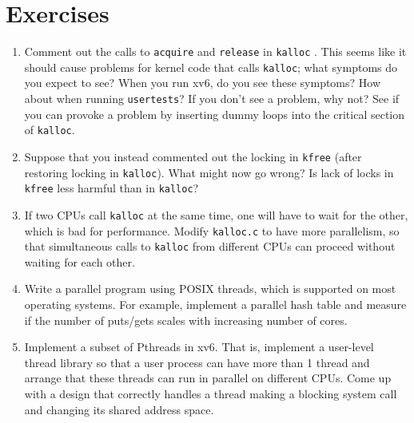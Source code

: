\section{Exercises}

\begin{enumerate}
  
\item Comment out the calls to
\lstinline{acquire}
and
\lstinline{release}
in
\lstinline{kalloc}
.
This seems like it should cause problems for
kernel code that calls
\lstinline{kalloc};
what symptoms do you expect to see?
When you run xv6, do you see these symptoms?
How about when running
\lstinline{usertests}?
If you don't see a problem, why not?
See if you can provoke a problem by inserting
dummy loops into the critical section of
\lstinline{kalloc}.

\item Suppose that you instead commented out the
locking in
\lstinline{kfree} 
(after restoring locking in
\lstinline{kalloc}).
What might now go wrong? Is lack of locks in
\lstinline{kfree}
less harmful than in
\lstinline{kalloc}?

\item If two CPUs call
\lstinline{kalloc}
at the same time, one will have to wait for the other,
which is bad for performance.
Modify 
\lstinline{kalloc.c}
to have more parallelism, so that simultaneous
calls to
\lstinline{kalloc}
from different CPUs can proceed without waiting for each other.

\item Write a parallel program using POSIX threads, which is supported on most
operating systems. For example, implement a parallel hash table and measure if
the number of puts/gets scales with increasing number of cores.

\item Implement a subset of Pthreads in xv6.  That is, implement a user-level
thread library so that a user process can have more than 1 thread and arrange
that these threads can run in parallel on different CPUs.  Come up with a
design that correctly handles a thread making a blocking system call and
changing its shared address space.

\end{enumerate}


